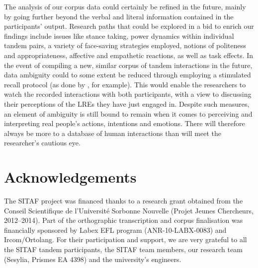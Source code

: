 \documentclass[output=paper,colorlinks,citecolor=brown,modfonts,nonflat]{../langscibook}
\begin{document}
The analysis of our corpus data could certainly be refined in the future, mainly by going further beyond the verbal and literal information contained in the participants’ output. Research paths that could be explored in a bid to enrich our findings include issues like stance taking, power dynamics within individual tandem pairs, a variety of face-saving strategies employed, notions of politeness and appropriateness, affective and empathetic reactions, as well as task effects. In the event of compiling a new, similar corpus of tandem interactions in the future, data ambiguity could to some extent be reduced through employing a stimulated recall protocol (as done by \citealt{MackeyEtAl2000}, for example). This would enable the researchers to watch the recorded interactions with both participants, with a view to discussing their perceptions of the LREs they have just engaged in. Despite such measures, an element of ambiguity is still bound to remain when it comes to perceiving and interpreting real people’s actions, intentions and emotions. There will therefore always be more to a database of human interactions than will meet the researcher’s cautious eye.

\section*{Acknowledgements}
The SITAF project was financed thanks to a research grant obtained from the Conseil Scientifique de l’Université Sorbonne Nouvelle (Projet Jeunes Chercheurs, 2012--2014). Part of the orthographic transcription and corpus finalisation was financially sponsored by Labex EFL program (ANR-10-LABX-0083) and Ircom/Ortolang. For their participation and support, we are very grateful to all the SITAF tandem participants, the SITAF team members, our research team (Sesylia, Prismes EA 4398) and the university’s engineers.

\sloppy\printbibliography[heading=subbibliography,notkeyword=this]
\end{document}
